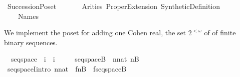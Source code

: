 %
\begin{isabellebody}%
%
%
\isadelimdocument
%
\endisadelimdocument
%
\isatagdocument
%
\isamarkuptrue%
%
\endisatagdocument
{\isafolddocument}%
%
\isadelimdocument
%
\endisadelimdocument
%
\isadelimtheory
%
\endisadelimtheory
%
\isatagtheory
{}\isamarkupfalse%
\ Succession{\isacharunderscore}{\kern0pt}Poset\isanewline
\ \ \isanewline
\ \ \ \ Arities\ Proper{\isacharunderscore}{\kern0pt}Extension\ Synthetic{\isacharunderscore}{\kern0pt}Definition\isanewline
\ \ \ \ Names\isanewline
{}%
\endisatagtheory
{\isafoldtheory}%
%
\isadelimtheory
%
\endisadelimtheory
%
\isadelimdocument
%
\endisadelimdocument
%
\isatagdocument
%
\isamarkuptrue%
%
\endisatagdocument
{\isafolddocument}%
%
\isadelimdocument
%
\endisadelimdocument
%
\begin{isamarkuptext}%
We implement the poset for adding one Cohen real, the set 
$2^{<\omega}$ of of finite binary sequences.%
\end{isamarkuptext}\isamarkuptrue%
\isamarkupfalse%
\isanewline
\ \ seqspace\ {\isacharcolon}{\kern0pt}{\isacharcolon}{\kern0pt}\ {\isachardoublequoteopen}i\ {\isasymRightarrow}\ i{\isachardoublequoteclose}\ {\isacharparenleft}{\kern0pt}{\isachardoublequoteopen}{\isacharunderscore}{\kern0pt}{\isacharcircum}{\kern0pt}{\isacharless}{\kern0pt}{\isasymomega}{\isachardoublequoteclose}\ {\isacharbrackleft}{\kern0pt}{}{}{}{\isacharbrackright}{\kern0pt}{}{}{}{\isacharparenright}{\kern0pt}\ \isanewline
\ \ {\isachardoublequoteopen}seqspace{\isacharparenleft}{\kern0pt}B{\isacharparenright}{\kern0pt}\ {\isasymequiv}\ {\isasymUnion}n{\isasymin}nat{\isachardot}{\kern0pt}\ {\isacharparenleft}{\kern0pt}n{\isasymrightarrow}B{\isacharparenright}{\kern0pt}{\isachardoublequoteclose}\isanewline
\isanewline
{}\isamarkupfalse%
\ seqspaceI{\isacharbrackleft}{\kern0pt}intro{\isacharbrackright}{\kern0pt}{\isacharcolon}{\kern0pt}\ {\isachardoublequoteopen}n{\isasymin}nat\ {\isasymLongrightarrow}\ f{\isacharcolon}{\kern0pt}n{\isasymrightarrow}B\ {\isasymLongrightarrow}\ f{\isasymin}seqspace{\isacharparenleft}{\kern0pt}B{\isacharparenright}{\kern0pt}{\isachardoublequoteclose}\isanewline
%
\isadelimproof
\ \ %
\endisadelimproof
%
\isatagproof
{}\isamarkupfalse%

\end{isabellebody}
